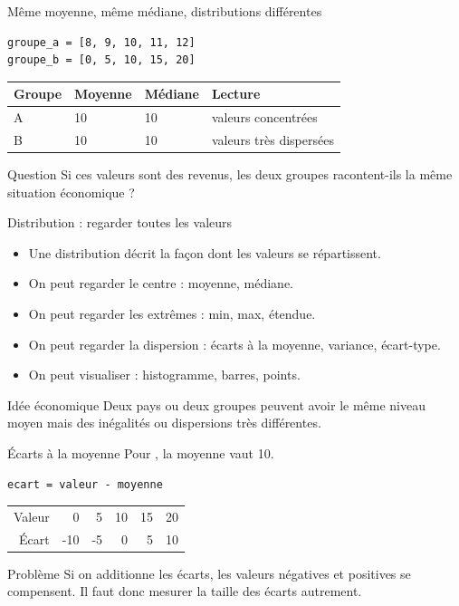 \documentclass[10pt,aspectratio=169]{beamer}
\begin{document}
\begin{frame}[fragile]{Même moyenne, même médiane, distributions différentes}
\begin{lstlisting}
groupe_a = [8, 9, 10, 11, 12]
groupe_b = [0, 5, 10, 15, 20]
\end{lstlisting}
\begin{tabular}{@{}llll@{}}
\toprule
Groupe & Moyenne & Médiane & Lecture \\
\midrule
A & 10 & 10 & valeurs concentrées \\
B & 10 & 10 & valeurs très dispersées \\
\bottomrule
\end{tabular}
\vspace{0.4cm}
\begin{block}{Question}
Si ces valeurs sont des revenus, les deux groupes racontent-ils la même situation économique ?
\end{block}
\end{frame}

\begin{frame}{Distribution : regarder toutes les valeurs}
\begin{itemize}
  \item Une distribution décrit la façon dont les valeurs se répartissent.
  \item On peut regarder le centre : moyenne, médiane.
  \item On peut regarder les extrêmes : min, max, étendue.
  \item On peut regarder la dispersion : écarts à la moyenne, variance, écart-type.
  \item On peut visualiser : histogramme, barres, points.
\end{itemize}
\begin{block}{Idée économique}
Deux pays ou deux groupes peuvent avoir le même niveau moyen mais des inégalités ou dispersions très différentes.
\end{block}
\end{frame}

\begin{frame}[fragile]{Écarts à la moyenne}
Pour , la moyenne vaut 10.
\begin{lstlisting}
ecart = valeur - moyenne
\end{lstlisting}
\begin{tabular}{@{}rrrrrr@{}}
\toprule
Valeur & 0 & 5 & 10 & 15 & 20 \\
Écart & -10 & -5 & 0 & 5 & 10 \\
\bottomrule
\end{tabular}
\vspace{0.45cm}
\begin{block}{Problème}
Si on additionne les écarts, les valeurs négatives et positives se compensent. Il faut donc mesurer la taille des écarts autrement.
\end{block}
\end{frame}
\end{document}
